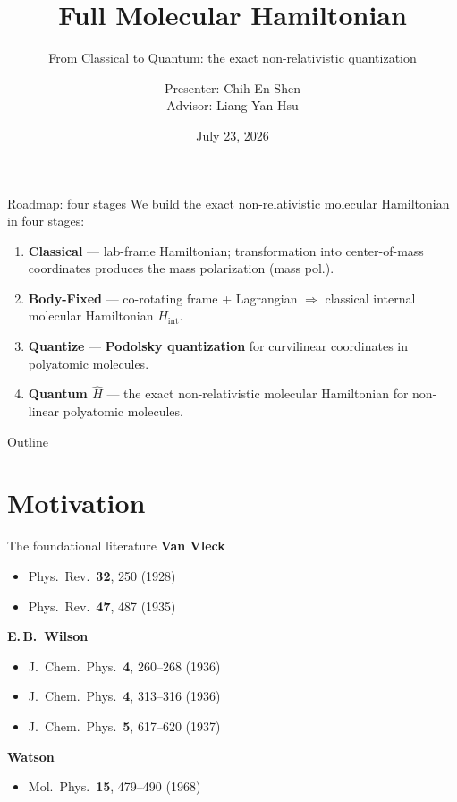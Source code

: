 \documentclass[aspectratio=169,10pt]{beamer}
\title{Full Molecular Hamiltonian}
\subtitle{From Classical to Quantum: the exact non-relativistic quantization}
\author{Presenter: Chih-En Shen \\ Advisor: Liang-Yan Hsu}
\date{July 23, 2026}
\newcommand{\stagenum}{0}
\newcommand{\setstage}[1]{\renewcommand{\stagenum}{#1}}
\begin{document}
{
\begin{frame}[plain]\titlepage\end{frame}}

\begin{frame}{Roadmap: four stages}
\setstage{0}
We build the \alert{exact} non-relativistic molecular Hamiltonian in four stages:
\begin{enumerate}
  \item \textbf{Classical} — lab-frame Hamiltonian; transformation into center-of-mass coordinates produces the mass polarization (mass pol.).
  \item \textbf{Body-Fixed} — co-rotating frame + Lagrangian $\Rightarrow$ classical internal molecular Hamiltonian $H_{\mathrm{int}}$.
  \item \textbf{Quantize} — \textbf{Podolsky quantization} for curvilinear coordinates in polyatomic molecules.
  \item \textbf{Quantum $\hat H$} — the exact non-relativistic molecular Hamiltonian for non-linear polyatomic molecules.
\end{enumerate}
\vspace{1ex}
\end{frame}

\begin{frame}{Outline}
\setstage{0}
\tableofcontents
\end{frame}

\section{Motivation}

\begin{frame}{The foundational literature}
\setstage{0}
\textbf{Van Vleck}
  \begin{itemize}\footnotesize
    \item[] Phys.\ Rev.\ \textbf{32}, 250 (1928)
    \item[] Phys.\ Rev.\ \textbf{47}, 487 (1935)
  \end{itemize}
\textbf{E.\,B.\ Wilson}
  \begin{itemize}\footnotesize
    \item[] J.\ Chem.\ Phys.\ \textbf{4}, 260--268 (1936)
    \item[] J.\ Chem.\ Phys.\ \textbf{4}, 313--316 (1936)
    \item[] J.\ Chem.\ Phys.\ \textbf{5}, 617--620 (1937)
  \end{itemize}
\textbf{Watson}
  \begin{itemize}\footnotesize
    \item[] Mol.\ Phys.\ \textbf{15}, 479--490 (1968)
  \end{itemize}
\end{frame}
\end{document}
